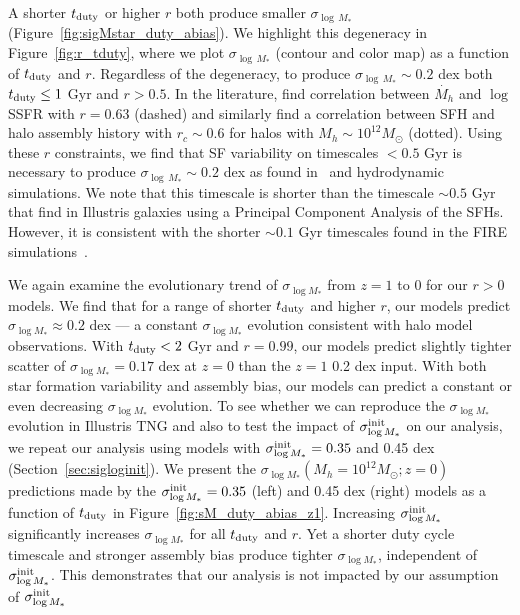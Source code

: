 \documentclass[12pt, letterpaper, preprint, tighten]{aastex62}
\newcommand{\edt}[1]{{\color{dred}{\bf} #1}}
\newcommand{\cao}{Cao et al. (in preparation)}
\newcommand{\tduty}{t_{\rm duty}}
\newcommand{\siglogm}{\sigma_{\log M_*}}
\begin{document}
A shorter $t_{\rm duty}$ or higher $r$ both produce smaller $\sigma_{\log\,M_*}$
(Figure~\ref{fig:sigMstar_duty_abias}). We highlight this degeneracy in
Figure~\ref{fig:r_tduty}, where we plot $\sigma_{\log\,M_*}$ (contour and
color map) as a function of $t_{\rm duty}$ and $r$. Regardless of the
degeneracy, to produce $\sigma_{\log\,M_*} \sim 0.2$ dex both $\tduty \leq 1$ Gyr
and $r > 0.5$. In the literature, \cite{tinker2018b} find correlation
between $\dot{M_h}$ and $\log$ SSFR with $r = 0.63$ (dashed) and
\cite{behroozi2018} similarly find a correlation between SFH and halo
assembly history with $r_c \sim 0.6$ for halos with $M_h \sim 10^{12}M_\odot$
(dotted). Using these $r$ constraints, we find that SF variability on
timescales $< 0.5$ Gyr is necessary to produce $\sigma_{\log\,M_*} \sim 0.2$ dex
as found in~\cite{more2011, leauthaud2012, reddick2013, tinker2013, zu2015}
and hydrodynamic simulations. We note that this timescale is shorter than
the timescale $\sim 0.5$ Gyr that \cite{sparre2015} find in Illustris galaxies
using a Principal Component Analysis of the SFHs. However, it is consistent with
the shorter $\sim 0.1$ Gyr timescales found in the FIRE simulations~\citep{hopkins2014, sparre2017}.


\edt{We again examine the evolutionary trend of $\siglogm$ from $z=1$ to 0 for our 
$r > 0$ models. We find that for a range of shorter $\tduty$ and higher $r$, our
models predict $\siglogm \approx 0.2$ dex --- a constant $\siglogm$ evolution 
consistent with halo model observations. With $\tduty < 2$ Gyr and $r=0.99$, our 
models predict slightly tighter scatter of $\siglogm=0.17$ dex at $z=0$ than the 
$z=1$ 0.2 dex input. With both star formation variability and assembly bias, our 
models can predict a constant or even decreasing $\siglogm$ evolution. To see 
whether we can reproduce the $\siglogm$ evolution in Illustris TNG and also to test the 
impact of $\siglogm^{\rm init}$ on our analysis, we repeat our analysis using models
with $\siglogm^{\rm init} = 0.35$ and 0.45 dex (Section~\ref{sec:sigloginit}).
We present the $\siglogm(M_h=10^{12}M_\odot; z=0)$ predictions made by 
the $\siglogm^{\rm init} = 0.35$ (left) and 0.45 dex (right) models as a 
function of $\tduty$ in Figure~\ref{fig:sM_duty_abias_z1}. Increasing 
$\siglogm^{\rm init}$ significantly increases $\siglogm$ for all $\tduty$ and $r$.  %
Yet a shorter duty cycle timescale and stronger assembly bias produce tighter 
$\siglogm$, independent of $\siglogm^{\rm init}$. This demonstrates that our analysis 
is not impacted by our assumption of $\siglogm^{\rm init}$
}
\end{document}
